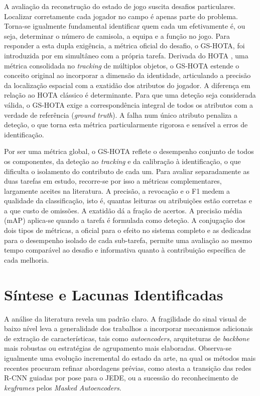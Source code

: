 A avaliação da reconstrução do estado de jogo suscita desafios particulares. Localizar
corretamente cada jogador no campo é apenas parte do problema. Torna-se igualmente
fundamental identificar quem cada um efetivamente é, ou seja, determinar o número de
camisola, a equipa e a função no jogo. Para responder a esta dupla exigência, a métrica
oficial do desafio, o GS-HOTA, foi introduzida por \citet{somers2024soccernet} em
simultâneo com a própria tarefa. Derivada do HOTA \citep{luiten2021hota}, uma métrica
consolidada no \emph{tracking} de múltiplos objetos, o GS-HOTA estende o conceito original
ao incorporar a dimensão da identidade, articulando a precisão da localização espacial com
a exatidão dos atributos do jogador. A diferença em relação ao HOTA clássico é
determinante. Para que uma deteção seja considerada válida, o GS-HOTA exige a
correspondência integral de todos os atributos com a verdade de referência (\emph{ground
truth}). A falha num único atributo penaliza a deteção, o que torna esta métrica
particularmente rigorosa e sensível a erros de identificação.

Por ser uma métrica global, o GS-HOTA reflete o desempenho conjunto de todos os
componentes, da deteção ao \emph{tracking} e da calibração à identificação, o que
dificulta o isolamento do contributo de cada um. Para avaliar separadamente as duas
tarefas em estudo, recorre-se por isso a métricas complementares, largamente aceites na
literatura. A precisão, a revocação e o F1 medem a qualidade da classificação, isto é,
quantas leituras ou atribuições estão corretas e a que custo de omissões. A exatidão dá a
fração de acertos. A precisão média (mAP) aplica-se quando a tarefa é formulada como
deteção. A conjugação dos dois tipos de métricas, a oficial para o efeito no sistema
completo e as dedicadas para o desempenho isolado de cada sub-tarefa, permite uma
avaliação ao mesmo tempo comparável ao desafio e informativa quanto à contribuição
específica de cada melhoria.

\section{Síntese e Lacunas Identificadas}

A análise da literatura revela um padrão claro. A fragilidade do sinal visual de baixo
nível leva a generalidade dos trabalhos a incorporar mecanismos adicionais de extração de
características, tais como \emph{autoencoders}, arquiteturas de \emph{backbone} mais
robustas ou estratégias de agrupamento mais elaboradas. Observa-se igualmente uma
evolução incremental do estado da arte, na qual os métodos mais recentes procuram refinar
abordagens prévias, como atesta a transição das redes R-CNN guiadas por pose para o JEDE,
ou a sucessão do reconhecimento de \emph{keyframes} pelos \emph{Masked Autoencoders}.

